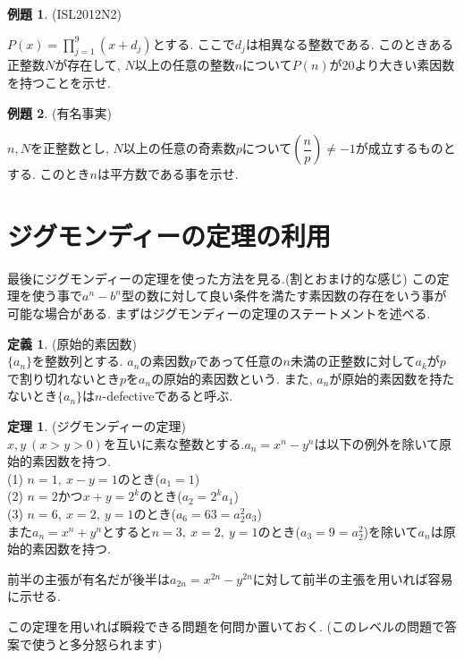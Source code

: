 \documentclass{ltjsarticle}
\theoremstyle{definition}
\newtheorem{thm}{定理}
\newtheorem{dfn}{定義}
\newtheorem{expr}{例題}
\begin{document}
\begin{expr}(ISL2012N2)

$P(x)=\displaystyle\prod_{j=1}^9(x+d_j)$とする. ここで$d_j$は相異なる整数である. このときある正整数$N$が存在して, $N$以上の任意の整数$n$について$P(n)$が$20$より大きい素因数を持つことを示せ.

\end{expr}

\begin{expr}(有名事実)

$n,N$を正整数とし, $N$以上の任意の奇素数$p$について$\left(\dfrac np\right)\neq-1$が成立するものとする. このとき$n$は平方数である事を示せ.

\end{expr}

\section{ジグモンディーの定理の利用}
最後にジグモンディーの定理を使った方法を見る.(割とおまけ的な感じ) この定理を使う事で$a^n-b^n$型の数に対して良い条件を満たす素因数の存在をいう事が可能な場合がある. まずはジグモンディーの定理のステートメントを述べる.

\begin{dfn}(原始的素因数)\\
$\{a_n\}$を整数列とする. $a_n$の素因数$p$であって任意の$n$未満の正整数に対して$a_k$が$p$で割り切れないとき$p$を$a_n$の原始的素因数という. また, $a_n$が原始的素因数を持たないとき$\{a_n\}$は$n$-defectiveであると呼ぶ.
\end{dfn}

\begin{thm}(ジグモンディーの定理)\\
$x,y\ (x>y>0)$を互いに素な整数とする.$a_n=x^n-y^n$は以下の例外を除いて原始的素因数を持つ.\\
(1) $n=1,\ x-y=1$のとき($a_1=1$)\\
(2) $n=2$かつ$x+y=2^k$のとき($a_2=2^ka_1$)\\
(3) $n=6,\ x=2,\ y=1$のとき($a_6=63=a_2^2a_3$)\\
また$a_n=x^n+y^n$とすると$n=3,\ x=2,\ y=1$のとき($a_3=9=a_2^2$)を除いて$a_n$は原始的素因数を持つ.
\end{thm}

前半の主張が有名だが後半は$a_{2n}=x^{2n}-y^{2n}$に対して前半の主張を用いれば容易に示せる.

この定理を用いれば瞬殺できる問題を何問か置いておく. (このレベルの問題で答案で使うと多分怒られます)
\end{document}
